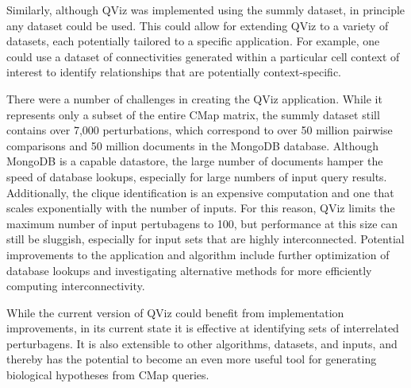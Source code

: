 \documentclass[12pt]{article}
\begin{document}
Similarly, although QViz was implemented using the summly dataset, in principle any dataset could be used. This could allow for extending QViz to a variety of datasets, each potentially tailored to a specific application. For example, one could use a dataset of connectivities generated within a particular cell context of interest to identify relationships that are potentially context-specific.

There were a number of challenges in creating the QViz application. While it represents only a subset of the entire CMap matrix, the summly dataset still contains over 7,000 perturbations, which correspond to over 50 million pairwise comparisons and 50 million documents in the MongoDB database. Although MongoDB is a capable datastore, the large number of documents hamper the speed of database lookups, especially for large numbers of input query results. Additionally, the clique identification is an expensive computation and one that scales exponentially with the number of inputs. For this reason, QViz limits the maximum number of input pertubagens to 100, but performance at this size can still be sluggish, especially for input sets that are highly interconnected. Potential improvements to the application and algorithm include further optimization of database lookups and investigating alternative methods for more efficiently computing interconnectivity.

While the current version of QViz could benefit from implementation improvements, in its current state it is effective at identifying sets of interrelated perturbagens. It is also extensible to other algorithms, datasets, and inputs, and thereby has the potential to become an even more useful tool for generating biological hypotheses from CMap queries.



\end{document}
